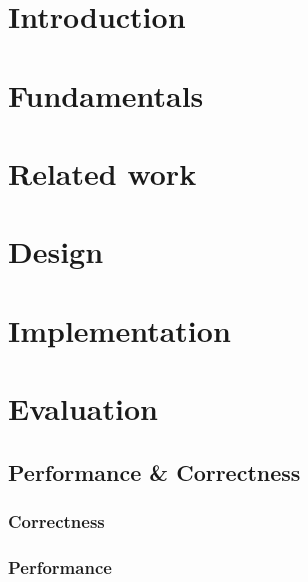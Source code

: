 \documentclass[
	11pt,
	a4paper,
	usegeometry,
	twoside,
	openright,
	toc=chapterentrywithdots
]{scrbook}
\begin{document}
	
	
	\tableofcontents
	\thispagestyle{empty}
	\clearpage
	
	\chapter{Introduction}
	
		
	
	\chapter{Fundamentals}
	\label{chap:fundamentals}
	
		
		
	\chapter{Related work}
	\label{chap:related-work}
	
		
	
	\chapter{Design}
	\label{chap:design}
	
		
	
	\chapter{Implementation}
	\label{chap:implementation}
	
		
	
	\chapter{Evaluation}
	\label{chap:evaluation}
	
		\section{Performance \& Correctness}
		
			\subsection{Correctness}
			
			\subsection{Performance}
			
\end{document}
